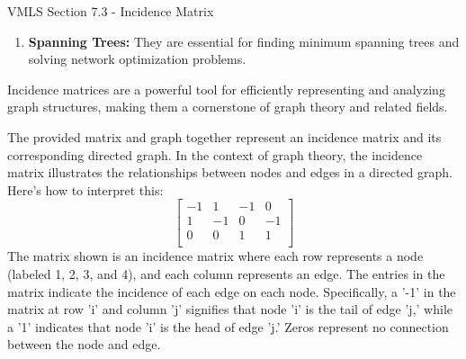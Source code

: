 \begin{notes}{VMLS Section 7.3 - Incidence Matrix}
\begin{enumerate}
        \item \textbf{Spanning Trees:} They are essential for finding minimum spanning trees and solving network optimization problems.
    \end{enumerate}

    Incidence matrices are a powerful tool for efficiently representing and analyzing graph structures, making them a cornerstone of graph theory and related fields.

    \begin{Highlight}
        The provided matrix and graph together represent an incidence matrix and its corresponding directed graph. In the context of graph theory, the incidence matrix illustrates the relationships 
        between nodes and edges in a directed graph. Here's how to interpret this:
        \begin{equation*}
            \begin{bmatrix}
                -1 & 1 & -1 & 0 \\
                1 & -1 & 0 & -1 \\
                0 & 0 & 1 & 1 \\
            \end{bmatrix}
        \end{equation*}
        The matrix shown is an incidence matrix where each row represents a node (labeled 1, 2, 3, and 4), and each column represents an edge. The entries in the matrix indicate the incidence of each 
        edge on each node. Specifically, a '-1' in the matrix at row 'i' and column 'j' signifies that node 'i' is the tail of edge 'j,' while a '1' indicates that node 'i' is the head of edge 'j.' 
        Zeros represent no connection between the node and edge.
        \begin{center}
\end{center}
\end{Highlight}
\end{notes}

